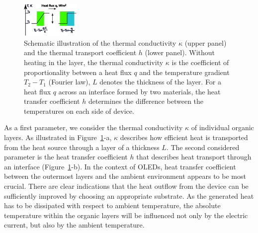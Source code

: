 \documentclass[%
9pt,
 aip,
rsi,%
 amsmath,amssymb,
preprint,%
]{revtex4-1}
\begin{document}
\begin{figure}
    \centering	
    \includegraphics[width=0.25\textwidth]{new_bc.eps}
    \caption{ Schematic illustration of the thermal conductivity $\kappa$ (upper panel) and the thermal transport coefficient $h$ (lower panel). Without heating in the layer, the thermal conductivity $\kappa$ is the coefficient of proportionality between a heat flux $q$ and the temperature gradient $T_2 - T_1$ (Fourier law), $L$ denotes the thickness of the layer. For a heat flux $q$ across an interface formed by two materials, the heat transfer coefficient $h$ determines the difference between the temperatures on each side of device.}
    \label{fig:bcpic}
\end{figure}

As a first parameter, we consider the thermal conductivity $\kappa$ of individual organic layers. 
As illustrated in Figure~\ref{fig:bcpic}-a, $\kappa$ describes how efficient heat is transported from the heat source through a layer of a thickness $L$. 
%
The second considered parameter is the heat transfer coefficient $h$ that describes heat transport through an interface (Figure~\ref{fig:bcpic}-b).\cite{Jin2014}
In the context of OLEDs, heat transfer coefficient between the outermost layers and the ambient environment  appears to be most crucial.
There are clear indications that the heat outflow from the device can be sufficiently improved by choosing an appropriate substrate.\cite{Chung2009,Triambulo2016} 
As the generated heat has to be dissipated with respect to ambient temperature, the absolute temperature within the organic layers will be influenced not only by the electric current, but also by the ambient temperature.
\end{document}

